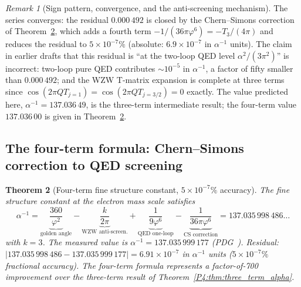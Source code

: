 \documentclass[11pt,a4paper]{article}
\newtheorem{theorem}{Theorem}[section]
\theoremstyle{definition}
\theoremstyle{remark}
\newtheorem{remark}[theorem]{Remark}
\newcommand{\vp}{\varphi}
\newcommand{\aInv}{\alpha^{-1}}
\begin{document}
\begin{remark}[Sign pattern, convergence, and the anti-screening mechanism]
The series converges: the residual $0.000\,492$ is closed by the
Chern--Simons correction of Theorem~\ref{P4:thm:four_term_alpha},
which adds a fourth term $-1/(36\pi\vp^6) = -T_3/(4\pi)$ and reduces
the residual to $5\times10^{-7}\%$
(absolute: $6.9\times10^{-7}$ in $\aInv$ units).
The claim in earlier drafts that this residual is ``at the two-loop QED
level $\alpha^2/(3\pi^2)$'' is incorrect: two-loop pure QED contributes
$\sim10^{-5}$ in $\aInv$, a factor of fifty smaller than $0.000\,492$;
and the WZW T-matrix expansion is complete at three terms since
$\cos(2\pi Q T_{j=1}) = \cos(2\pi Q T_{j=3/2}) = 0$ exactly.
The value predicted here, $\aInv = 137.036\,49$, is the three-term
intermediate result; the four-term value $137.036\,00$ is given in
Theorem~\ref{P4:thm:four_term_alpha}.
\end{remark}

\subsection{The four-term formula: Chern--Simons correction to QED screening}
\label{P4:sec:four_term_alpha}

\begin{theorem}[Four-term fine structure constant, $5\times10^{-7}\%$ accuracy]
\label{P4:thm:four_term_alpha}
The fine structure constant at the electron mass scale satisfies
\begin{equation}
  \boxed{
  \aInv
  = \underbrace{\frac{360}{\vp^2}}_{\text{golden angle}}
  - \underbrace{\frac{k}{2\pi}}_{\text{WZW anti-screen.}}
  + \underbrace{\frac{1}{9\vp^6}}_{\text{QED one-loop}}
  - \underbrace{\frac{1}{36\pi\vp^6}}_{\text{CS correction}}
  = 137.035\,998\,486\ldots
  }
  \label{P4:eq:four_term}
\end{equation}
with $k=3$.  The measured value is $\aInv = 137.035\,999\,177$
(PDG~\cite{PDG2024}).  Residual: $|137.035\,998\,486 - 137.035\,999\,177|
= 6.91\times10^{-7}$ in $\aInv$ units
($5\times10^{-7}\%$ fractional accuracy).
The four-term formula represents a factor-of-700 improvement over the
three-term result of Theorem~\ref{P4:thm:three_term_alpha}.
\end{theorem}
\end{document}
